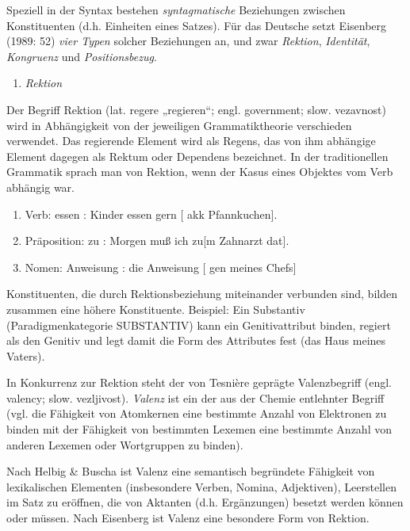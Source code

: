 \documentclass[
]{article}
\providecommand{\tightlist}{%
  \setlength{\itemsep}{0pt}\setlength{\parskip}{0pt}}
\begin{document}
Speziell in der Syntax bestehen \emph{syntagmatische} Beziehungen zwischen Konstituenten (d.h. Einheiten eines Satzes). Für das Deutsche setzt Eisenberg (1989: 52) \emph{vier Typen} solcher Beziehungen an, und zwar \emph{Rektion}, \emph{Identität}, \emph{Kongruenz} und \emph{Positionsbezug}.

\begin{enumerate}
\def\labelenumi{\arabic{enumi}.}
\tightlist
\item
  \emph{Rektion}
\end{enumerate}

Der Begriff Rektion (lat. regere „regieren``; engl. government; slow. vezavnost) wird in Abhängigkeit von der jeweiligen Grammatiktheorie verschieden verwendet. Das regierende Element wird als Regens, das von ihm abhängige Element dagegen als Rektum oder Dependens bezeichnet. In der traditionellen Grammatik sprach man von Rektion, wenn der Kasus eines Objektes vom Verb abhängig war.

\begin{enumerate}
\def\labelenumi{(\arabic{enumi})}
\tightlist
\item
  Verb: essen : Kinder essen gern {[} akk Pfannkuchen{]}.
\item
  Präposition: zu : Morgen muß ich zu{[}m Zahnarzt dat{]}.
\item
  Nomen: Anweisung : die Anweisung {[} gen meines Chefs{]}
\end{enumerate}

Konstituenten, die durch Rektionsbeziehung miteinander verbunden sind, bilden zusammen eine höhere Konstituente. Beispiel: Ein Substantiv (Paradigmenkategorie SUBSTANTIV) kann ein Genitivattribut binden, regiert als den Genitiv und legt damit die Form des Attributes fest (das Haus meines Vaters).

In Konkurrenz zur Rektion steht der von Tesnière geprägte Valenzbegriff (engl. valency; slow. vezljivost). \emph{Valenz} ist ein der aus der Chemie entlehnter Begriff (vgl. die Fähigkeit von Atomkernen eine bestimmte Anzahl von Elektronen zu binden mit der Fähigkeit von bestimmten Lexemen eine bestimmte Anzahl von anderen Lexemen oder Wortgruppen zu binden).

Nach Helbig \& Buscha ist Valenz eine semantisch begründete Fähigkeit von lexikalischen Elementen (insbesondere Verben, Nomina, Adjektiven), Leerstellen im Satz zu eröffnen, die von Aktanten (d.h. Ergänzungen) besetzt werden können oder müssen. Nach Eisenberg ist Valenz eine besondere Form von Rektion.
\end{document}
